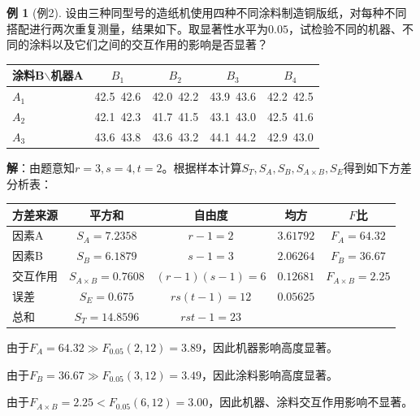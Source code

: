 \documentclass[11pt,a4paper]{report}
\theoremstyle{definition}
\newtheorem{example}{例}[chapter]
\theoremstyle{plain}
\begin{document}
\begin{example}[例2]
设由三种同型号的造纸机使用四种不同涂料制造铜版纸，对每种不同搭配进行两次重复测量，结果如下。取显著性水平为$0.05$，试检验不同的机器、不同的涂料以及它们之间的交互作用的影响是否显著？
\begin{center}
\begin{tabular}{@{}lcccc@{}}
\toprule
涂料B$\backslash$机器A & $B_1$ & $B_2$ & $B_3$ & $B_4$ \\
\midrule
$A_1$ & 42.5\ 42.6 & 42.0\ 42.2 & 43.9\ 43.6 & 42.2\ 42.5 \\
$A_2$ & 42.1\ 42.3 & 41.7\ 41.5 & 43.1\ 43.0 & 42.5\ 41.6 \\
$A_3$ & 43.6\ 43.8 & 43.6\ 43.2 & 44.1\ 44.2 & 42.9\ 43.0 \\
\bottomrule
\end{tabular}
\end{center}

\textbf{解}：由题意知$r=3,s=4,t=2$。根据样本计算$S_T,S_A,S_B,S_{A\times B},S_E$得到如下方差分析表：
\begin{center}
\begin{tabular}{@{}lcccc@{}}
\toprule
方差来源 & 平方和 & 自由度 & 均方 & $F$比 \\
\midrule
因素A & $S_A=7.2358$ & $r-1=2$ & $3.61792$ & $F_A=64.32$ \\
因素B & $S_B=6.1879$ & $s-1=3$ & $2.06264$ & $F_B=36.67$ \\
交互作用 & $S_{A\times B}=0.7608$ & $(r-1)(s-1)=6$ & $0.12681$ & $F_{A\times B}=2.25$ \\
误差 & $S_E=0.675$ & $rs(t-1)=12$ & $0.05625$ & \\
总和 & $S_T=14.8596$ & $rst-1=23$ & & \\
\bottomrule
\end{tabular}
\end{center}

由于$F_A=64.32\gg F_{0.05}(2,12)=3.89$，因此机器影响高度显著。

由于$F_B=36.67\gg F_{0.05}(3,12)=3.49$，因此涂料影响高度显著。

由于$F_{A\times B}=2.25<F_{0.05}(6,12)=3.00$，因此机器、涂料交互作用影响不显著。
\end{example}
\end{document}
